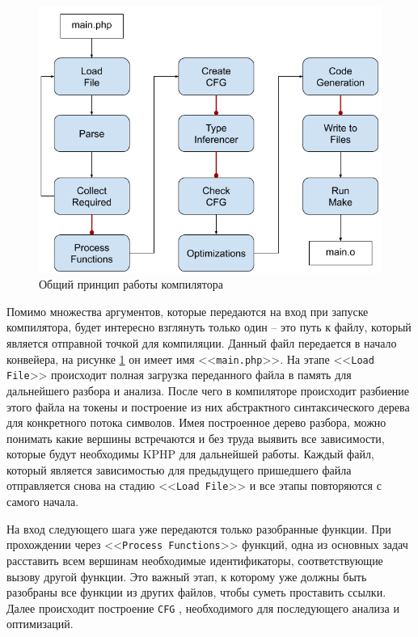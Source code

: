 \begin{figure}[H]
    \caption{Общий принцип работы компилятора}
    \label{fig:compiler_arch}
    \centering
    \includegraphics[width=\linewidth]{images/compiler_arch}
\end{figure}

Помимо множества аргументов, которые передаются на вход при запуске компилятора, будет интересно взглянуть только один -- это путь к файлу, который является отправной точкой для компиляции.
Данный файл передается в начало конвейера, на рисунке \ref{fig:compiler_arch} он имеет имя <<\verb|main.php|>>.
На этапе <<\verb|Load File|>> происходит полная загрузка переданного файла в память для дальнейшего разбора и анализа.
После чего в компиляторе происходит разбиение этого файла на токены и построение из них абстрактного синтаксического дерева для конкретного потока символов.
Имея построенное дерево разбора, можно понимать какие вершины встречаются и без труда выявить все зависимости, которые будут необходимы KPHP для дальнейшей работы.
Каждый файл, который является зависимостью для предыдущего пришедшего файла отправляется снова на стадию <<\verb|Load File|>> и все этапы повторяются с самого начала.

На вход следующего шага уже передаются только разобранные функции.
При прохождении через <<\verb|Process Functions|>>  функций, одна из основных задач расставить всем вершинам необходимые идентификаторы, соответствующие вызову другой функции.
Это важный этап, к которому уже должны быть разобраны все функции из других файлов, чтобы суметь проставить ссылки.
Далее происходит построение \verb|CFG| \cite{CFG}, необходимого для последующего анализа и оптимизаций.

